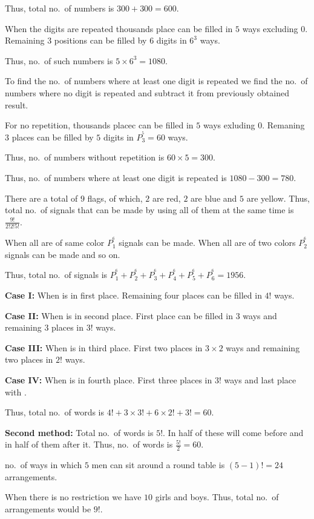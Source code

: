   Thus, total no.\ of numbers is $300 + 300 = 600$.
\item When the digits are repeated thousands place can be filled in $5$ ways excluding $0$. Remaining $3$
  positions can be filled by $6$ digits in $6^3$ ways.

  Thus, no.\ of such numbers is $5\times6^3 = 1080$.

  To find the no.\ of numbers where at least one digit is repeated we find the no.\ of numbers where no digit
  is repeated and subtract it from previously obtained result.

  For no repetition, thousands placec can be filled in $5$ ways exluding $0$. Remaning $3$ places can be
  filled by $5$ digits in $P_3^^5 = 60$ ways.

  Thus, no.\ of numbers without repetition is $60\times 5 = 300$.

  Thus, no.\ of numbers where at least one digit is repeated is $1080 - 300 = 780$.
\item There are a total of $9$ flags, of which, $2$ are red, $2$ are blue and $5$ are yellow. Thus, total
  no.\ of signals that can be made by using all of them at the same time is $\frac{9!}{2!2!5!}$.
\item When all are of same color $P_1^^6$ signals can be made. When all are of two colors $P_2^^6$ signals
  can be made and so on.

  Thus, total no.\ of signals is $P_1^^6 + P_2^^6 + P_3^^6 + P_4^^6 + P_5^^6 + P_6^^6 = 1956$.
\item {\bf Case I:} When  is in first place. Remaining four places can be filled in $4!$ ways.

  {\bf Case II:} When  is in second place. First place can be filled in $3$ ways and remaining $3$
  places in $3!$ ways.

  {\bf Case III:} When  is in third place. First two places in $3\times2$ ways and remaining two
  places in $2!$ ways.

  {\bf Case IV:} When  is in fourth place. First three places in $3!$ ways and last place with
  .

  Thus, total no.\ of words is $4! + 3\times3! + 6\times2! + 3! = 60$.

  {\bf Second method:} Total no.\ of words is $5!$. In half of these  will come before  and
  in half of them after it. Thus, no.\ of words is $\frac{5!}{2} = 60$.
\item no.\ of ways in which $5$ men can sit around a round table is $(5 - 1)! = 24$ arrangements.
\item When there is no restriction we have $10$ girls and boys. Thus, total no.\ of arrangements would be
  $9!$.

